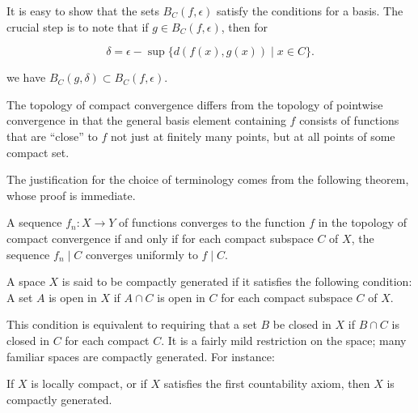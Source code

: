 It is easy to show that the sets \(B_{C}({f,\epsilon })\) satisfy the conditions for a basis. The crucial step is to note that if \(g \in {B}_{C}({f,\epsilon })\), then for

\[
\delta = \epsilon - \sup \{ d({f(x),g(x) }) \mid x \in C\}.
\]

we have \(B_{C}({g,\delta }) \subset {B}_{C}({f,\epsilon })\).

The topology of compact convergence differs from the topology of pointwise convergence in that the general basis element containing \(f\) consists of functions that are ``close'' to \(f\) not just at finitely many points, but at all points of some compact set.

The justification for the choice of terminology comes from the following theorem, whose proof is immediate.

\begin{theorem}
\label{thm:\thetheorem}
A sequence \(f_{n} : X \rightarrow Y\) of functions converges to the function \(f\) in the topology of compact convergence if and only if for each compact subspace \(C\) of \(X\), the sequence \(f_{n} \mid C\) converges uniformly to \(f \mid C\).
\end{theorem}

\begin{definition}
A space \(X\) is said to be compactly generated if it satisfies the following condition: A set \(A\) is open in \(X\) if \(A \cap C\) is open in \(C\) for each compact subspace \(C\) of \(X\).
\end{definition}

This condition is equivalent to requiring that a set \(B\) be closed in \(X\) if \(B \cap C\) is closed in \(C\) for each compact \(C\). It is a fairly mild restriction on the space; many familiar spaces are compactly generated. For instance:

\begin{lemma}
\label{lem:46.3}
If \(X\) is locally compact, or if \(X\) satisfies the first countability axiom, then \(X\) is compactly generated.
\end{lemma}

